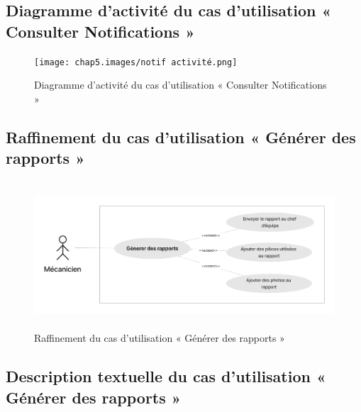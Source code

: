 \subsection{Diagramme d'activité du cas d’utilisation « Consulter Notifications »}


\begin{figure}[ht!]
    \centering
    \texttt{[image: chap5.images/notif activité.png]}
    \caption{ Diagramme d'activité du cas d’utilisation « Consulter Notifications » }
\end{figure}




\newpage
\subsection{Raffinement du cas d'utilisation « Générer des rapports »}

\begin{figure}[h!]
    \centering
    \includegraphics[width=1\textwidth,height=5.5cm]{chap5.images/raff generer rapport.png}
    \caption{ Raffinement du cas d'utilisation « Générer des rapports » }
\end{figure}

\subsection{Description textuelle du cas d’utilisation « Générer des rapports »}

